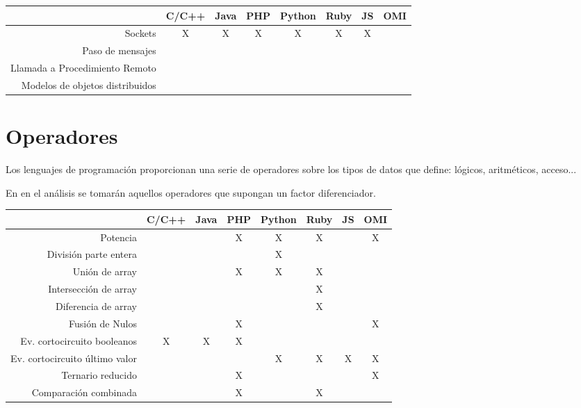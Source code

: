 \FloatBarrier
\begin{table}[h]
\begin{center}
 
\begin{tabular}{|r|c|c|c|c|c|c|c|} \hline
 & C/C++ & Java & PHP  & Python & Ruby & JS & OMI\\ \hline
Sockets & X & X & X & X & X  & X &  \\ \hline
Paso de mensajes & & &  &  &  &  &  \\ \hline
Llamada a Procedimiento Remoto & & &  &  &  &  &  \\ \hline
Modelos de objetos distribuidos & & &  &  &  &  &  \\ \hline
\end{tabular}
\end{center}
\end{table}
\FloatBarrier

\section{Operadores}
Los lenguajes de programación proporcionan una serie de operadores sobre los
tipos de datos que define: lógicos, aritméticos, acceso...

En en el análisis se tomarán aquellos operadores que supongan un factor 
diferenciador.

\FloatBarrier
\begin{table}[h]
\begin{center}
 
\begin{tabular}{|r|c|c|c|c|c|c|c|} \hline
 & C/C++ & Java & PHP  & Python & Ruby & JS & OMI\\ \hline
Potencia & & & X & X & X  &  & X \\ \hline
División parte entera & & &  & X &   &  &  \\ \hline
Unión de array & & & X & X & X  &  &  \\ \hline
Intersección de array & & &  &  & X  &  &  \\ \hline
Diferencia de array & & &  &  & X  &  &  \\ \hline
Fusión de Nulos  & & & X &  &   &  & X \\ \hline
Ev. cortocircuito booleanos & X & X & X &  &   &  &  \\ \hline
Ev. cortocircuito último valor & &  & & X & X  & X & X \\ \hline
Ternario reducido & &  & X &  &   &  & X \\ \hline
Comparación combinada & & & X &  & X  &  &  \\ \hline
\end{tabular}
\end{center}
\end{table}
\FloatBarrier



